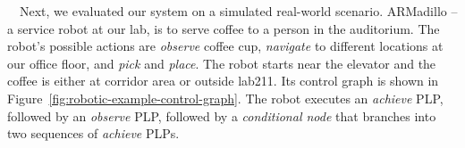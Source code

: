 \documentclass[letterpaper]{article}
\begin{document}
\ \ 
Next, we evaluated our system on a simulated real-world scenario. 
ARMadillo -- a service robot at our lab, is to serve coffee to a person in the auditorium.
The robot's possible actions are {\em observe} coffee cup, {\em navigate} to different locations at our office floor, and {\em pick} and {\em place}. %
%
%
%
%
%
%
The robot starts near the elevator and the coffee is either at corridor area or outside lab211. Its control graph is shown in Figure~\ref{fig:robotic-example-control-graph}. 
The robot executes an {\em achieve} PLP, followed by an {\em observe} PLP, followed by a {\em conditional node} that branches into  two sequences of {\em achieve} PLPs.



\end{document}
